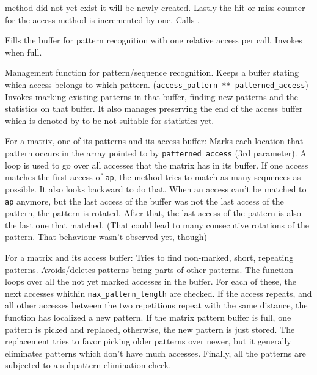 \begin{description}
    method did not yet exist it will be newly created. Lastly the hit or miss counter for the access method is incremented
	by one. Calls .
\item[\fun{update\_matrix\_pattern\_stats}] Fills the buffer for pattern recognition with one relative access per call. Invokes  when full.
\item[\fun{process\_pattern\_buffer(traced\_matrix*)}] Management function for pattern/sequence recognition. Keeps a buffer stating which access belongs to which pattern. (\texttt{access\_pattern ** patterned\_access}) Invokes marking existing patterns in that buffer, finding new patterns and the statistics on that buffer. It also manages preserving the end of the access buffer which is denoted by  to be not suitable for statistics yet.
\item[\fun{mark\_pattern\_findings}] For a matrix, one of its patterns and its access buffer: Marks each location that pattern occurs in the array pointed to by \texttt{patterned\_access} (3rd parameter).\newline
	A loop is used to go over all accesses that the matrix has in its buffer. If one access matches the first access of \texttt{ap}, the method tries to match as many sequences as possible. It also looks backward to do that. When an access can't be matched to \texttt{ap} anymore, but the last access of the buffer was not the last access of the pattern, the pattern is rotated. After that, the last access of the pattern is also the last one that matched. (That could lead to many consecutive rotations of the pattern. That behaviour wasn't observed yet, though)
\item[\fun{find\_new\_patterns}] For a matrix and its access buffer: Tries to find non-marked, short, repeating patterns. Avoids/deletes patterns being parts of other patterns.\newline
	The function loops over all the not yet marked accesses in the buffer. For each of these, the next accesses whithin \texttt{max\_pattern\_length} are checked. If the access repeats, and all other accesses between the two repetitions repeat with the same distance, the function has localized a new pattern. If the matrix pattern buffer is full, one pattern is picked and replaced, otherwise, the new pattern is just stored. The replacement tries to favor picking older patterns over newer, but it generally eliminates patterns which don't have much accesses. Finally, all the patterns are subjected to a subpattern elimination check.

\end{description}

